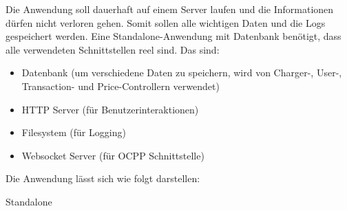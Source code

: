 Die Anwendung soll dauerhaft auf einem Server laufen und die Informationen dürfen nicht verloren gehen.
Somit sollen alle wichtigen Daten und die Logs gespeichert werden. 
Eine Standalone-Anwendung mit Datenbank benötigt, dass alle verwendeten Schnittstellen reel sind. Das sind:
\begin{itemize}
    \item Datenbank (um verschiedene Daten zu speichern, wird von Charger-, User-, Transaction- und Price-Controllern verwendet)
    \item HTTP Server (für Benutzerinteraktionen)
    \item Filesystem (für Logging)
    \item Websocket Server (für OCPP Schnittstelle)
\end{itemize}
Die Anwendung lässt sich wie folgt darstellen:

{Standalone}